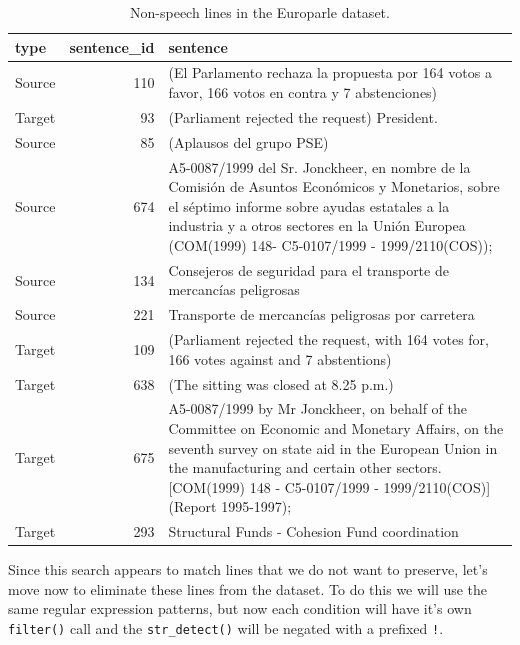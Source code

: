 \documentclass[
  letterpaper,
]{latex/krantz}
\begin{document}
\hypertarget{tbl-td-europarle-search-non-speech}{}
\begin{table}
\caption{\label{tbl-td-europarle-search-non-speech}Non-speech lines in the Europarle dataset. }\tabularnewline

\centering
\begin{tabular}{lrl}
\toprule
type & sentence\_id & sentence\\
\midrule
Source & 110 & (El Parlamento rechaza la propuesta por 164 votos a favor, 166 votos en contra y 7 abstenciones)\\
Target & 93 & (Parliament rejected the request) President.\\
Source & 85 & (Aplausos del grupo PSE)\\
Source & 674 & A5-0087/1999 del Sr. Jonckheer, en nombre de la Comisión de Asuntos Económicos y Monetarios, sobre el séptimo informe sobre ayudas estatales a la industria y a otros sectores en la Unión Europea (COM(1999) 148- C5-0107/1999 - 1999/2110(COS));\\
Source & 134 & Consejeros de seguridad para el transporte de mercancías peligrosas\\
\addlinespace
Source & 221 & Transporte de mercancías peligrosas por carretera\\
Target & 109 & (Parliament rejected the request, with 164 votes for, 166 votes against and 7 abstentions)\\
Target & 638 & (The sitting was closed at 8.25 p.m.)\\
Target & 675 & A5-0087/1999 by Mr Jonckheer, on behalf of the Committee on Economic and Monetary Affairs, on the seventh survey on state aid in the European Union in the manufacturing and certain other sectors. [COM(1999) 148 - C5-0107/1999 - 1999/2110(COS)] (Report 1995-1997);\\
Target & 293 & Structural Funds - Cohesion Fund coordination\\
\bottomrule
\end{tabular}
\end{table}

Since this search appears to match lines that we do not want to
preserve, let's move now to eliminate these lines from the dataset. To
do this we will use the same regular expression patterns, but now each
condition will have it's own \texttt{filter()} call and the
\texttt{str\_detect()} will be negated with a prefixed \texttt{!}.
\end{document}
